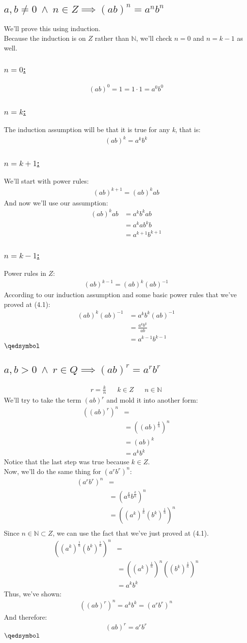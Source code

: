 \documentclass[a4paper, 12pt]{article}
\newcommand{\sub}[1]{\subsection{\underline{#1}}}
\newcommand{\subsub}[1]{\subsubsection{\underline{#1}}}
\newcommand{\N}{\ensuremath{\mathbb{N}}}
\newcommand{\eq}[1]{\begin{align*}#1\end{align*}}
\renewcommand{\qed}{\hfill\(\qedsymbol\)}
\begin{document}
\section{}
\sub{$a,b\neq{0}~\land~n\in{Z} \implies (ab)^n=a^nb^n$}
We'll prove this using induction.\\
Because the induction is on $Z$ rather than $\N$, we'll check $n=0$ and $n=k-1$ as well.
\subsub{$n=0$:}
\eq{
    (ab)^0=1=1\cdot1=a^0b^0
}
\subsub{$n=k$:}
The induction assumption will be that it is true for any \textit{k}, that is:
\eq{
    (ab)^k=a^kb^k
}
\subsub{$n=k+1$:}
We'll start with power rules:
\eq{
    (ab)^{k+1}=(ab)^kab
}
And now we'll use our assumption:
\eq{
    (ab)^kab&=a^kb^kab\\
    &=a^kab^kb\\
    &=a^{k+1}b^{k+1}
}
\subsub{$n=k-1$:}
Power rules in $Z$:
\eq{
    (ab)^{k-1}=(ab)^k(ab)^{-1}
}
According to our induction assumption and some basic power rules that we've proved at (4.1):
\eq{
    (ab)^k(ab)^{-1}&=a^kb^k(ab)^{-1}\\
    &=\frac{a^kb^k}{ab}\\
    &=a^{k-1}b^{k-1}
}
\qed
\sub{$a,b>0~\land~r\in{Q} \implies (ab)^r=a^rb^r$}
\eq{
    r=\frac{k}{n} && k\in{Z} && n\in\N
}
We'll try to take the term $(ab)^r$ and mold it into another form:
\eq{
    ((ab)^r)^n&=\\
    &=((ab)^{\frac{k}{n}})^n\\
    &=(ab)^k\\
    &=a^kb^k
}
Notice that the last step was true because $k\in{Z}$.\\
Now, we'll do the same thing for $(a^rb^r)^n$:
\eq{
    (a^rb^r)^n&=\\
    &=(a^{\frac{k}{n}}b^{\frac{k}{n}})^n\\
    &=((a^k)^\frac{1}{n}(b^k)^\frac{1}{n})^n\\
}
Since $n\in\N\subset{Z}$, we can use the fact that we've just proved at (4.1).\\
\eq{
    ((a^k)^\frac{1}{n}(b^k)^\frac{1}{n})^n&=\\
    &=((a^k)^\frac{1}{n})^n((b^k)^\frac{1}{n})^n\\
    &=a^kb^k
}
Thus, we've shown:
\eq{
    ((ab)^r)^n=a^kb^k=(a^rb^r)^n
}
And therefore:
\eq{
    (ab)^r=a^rb^r
}
\qed

\pagebreak
\setcounter{section}{5}
\section{}
\pagebreak
\end{document}
